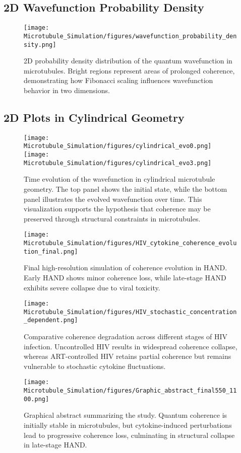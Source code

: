 \subsection{2D Wavefunction Probability Density}
\begin{figure}[H]
    \centering
    \texttt{[image: Microtubule\_Simulation/figures/wavefunction\_probability\_density.png]}
    \caption{2D probability density distribution of the quantum wavefunction in microtubules. Bright regions represent areas of prolonged coherence, demonstrating how Fibonacci scaling influences wavefunction behavior in two dimensions.}
    \label{fig:wavefunction_2D}
\end{figure}
\subsection{2D Plots in Cylindrical Geometry}
\begin{figure}[H]
    \centering
    \texttt{[image: Microtubule\_Simulation/figures/cylindrical\_evo0.png]}
    \texttt{[image: Microtubule\_Simulation/figures/cylindrical\_evo3.png]}
    \caption{Time evolution of the wavefunction in cylindrical microtubule geometry. The top panel shows the initial state, while the bottom panel illustrates the evolved wavefunction over time. This visualization supports the hypothesis that coherence may be preserved through structural constraints in microtubules.}
    \label{fig:cylindrical_geometry}
\end{figure}
\FloatBarrier  %
\begin{figure}[H]
    \centering
    \texttt{[image: Microtubule\_Simulation/figures/HIV\_cytokine\_coherence\_evolution\_final.png]}
    \caption{Final high-resolution simulation of coherence evolution in HAND. Early HAND shows minor coherence loss, while late-stage HAND exhibits severe collapse due to viral toxicity.} \label{fig:HIV_coherence_evolution_final}
\end{figure}
\begin{figure}[H]
    \centering
    \texttt{[image: Microtubule\_Simulation/figures/HIV\_stochastic\_concentration\_dependent.png]}
    \caption{Comparative coherence degradation across different stages of HIV infection. Uncontrolled HIV results in widespread coherence collapse, whereas ART-controlled HIV retains partial coherence but remains vulnerable to stochastic cytokine fluctuations.}
    \label{fig:HIV_coherence_stages}
\end{figure}
\begin{figure}[H]
\centering
\texttt{[image: Microtubule\_Simulation/figures/Graphic\_abstract\_final550\_1100.png]}
    \caption{Graphical abstract summarizing the study. Quantum coherence is initially stable in microtubules, but cytokine-induced perturbations lead to progressive coherence loss, culminating in structural collapse in late-stage HAND.}
    \label{fig:HIV_graphical_abstract}
\end{figure}
\FloatBarrier  %